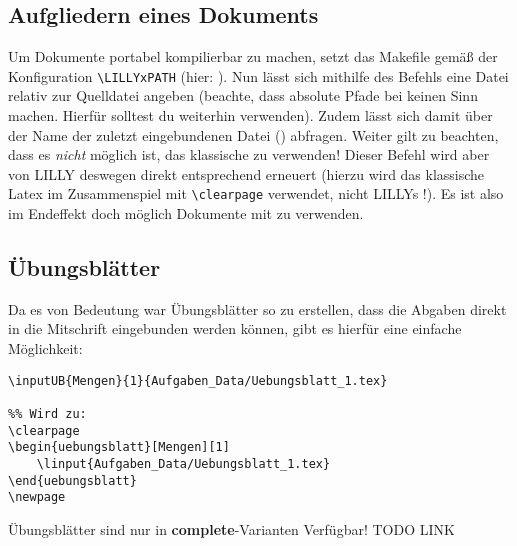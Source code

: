 \subsection{Aufgliedern eines Dokuments}
Um Dokumente portabel kompilierbar zu machen, setzt das Makefile gemäß der Konfiguration \verb|\LILLYxPATH| (hier: \say{\T{\LILLYxPATH}}). Nun lässt sich mithilfe des Befehls  eine Datei relativ zur Quelldatei angeben (beachte, dass absolute Pfade bei  keinen Sinn machen. Hierfür solltest du weiterhin \verb|| verwenden).\newline
Zudem lässt sich damit über  der Name der zuletzt eingebundenen Datei (\T{\LILLYxDOCUMENTxSUBNAME}) abfragen.\newline
{}Weiter gilt zu beachten, dass es \emph{nicht} möglich ist, das klassische \verb|| zu verwenden! Dieser Befehl wird aber von LILLY deswegen direkt entsprechend erneuert (hierzu wird das klassische Latex \verb|| im Zusammenspiel mit \verb|\clearpage| verwendet, nicht LILLYs !). Es ist also im Endeffekt doch möglich Dokumente mit \verb|| 
zu verwenden.





\subsection{Übungsblätter}
Da es von Bedeutung war Übungsblätter so zu erstellen, dass die Abgaben direkt in die Mitschrift eingebunden werden können, gibt es hierfür eine einfache Möglichkeit:
\begin{lstlisting}[style=latex]
%% \inputUB{<Name>}{<Nummer>}{<Pfad - linput>}
\inputUB{Mengen}{1}{Aufgaben_Data/Uebungsblatt_1.tex} 

%% Wird zu: 
\clearpage
\begin{uebungsblatt}[Mengen][1]
    \linput{Aufgaben_Data/Uebungsblatt_1.tex}
\end{uebungsblatt}
\newpage
\end{lstlisting}
Übungsblätter sind nur in \textbf{complete}-Varianten Verfügbar! TODO LINK


\clearpage
